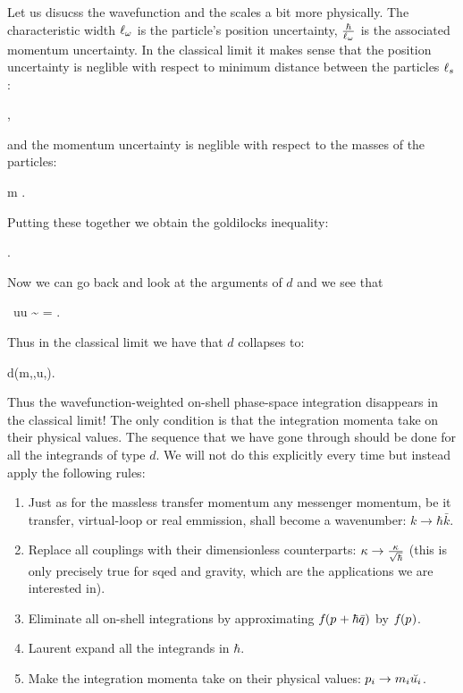\documentclass[
  10pt,
  a4paper,
  DIV=11,
  numbers=noendperiod,
  twoside]{scrreprt}
\providecommand{\tightlist}{%
  \setlength{\itemsep}{0pt}\setlength{\parskip}{0pt}}\usepackage{longtable,booktabs,array}
\let\[\relax \let\]\relax %
\DeclareRobustCommand{\[}{\begin{equation}}
\DeclareRobustCommand{\]}{\end{equation}}
\begin{document}
Let us disucss the wavefunction and the scales a bit more physically.
The characteristic width \(\wfwidth\) is the particle's position
uncertainty, \(\frac{\hbar}{\wfwidth}\) is the associated momentum
uncertainty. In the classical limit it makes sense that the position
uncertainty is neglible with respect to minimum distance between the
particles \(\scatlen\):

\[
\wfwidth\ll \scatlen,
\]

and the momentum uncertainty is neglible with respect to the masses of
the particles:

\[
\frac{\hbar}{\wfwidth}\ll m \implies \comptlen\ll \wfwidth.
\]

Putting these together we obtain the goldilocks inequality:

\[
\comptlen\ll\wfwidth\ll\scatlen.
\]

Now we can go back and look at the arguments of \(d\) and we see that

\[
\scatlen\, \tw \cdot u\gg\wfwidth \tw \cdot u \sim \sqrt{\xi} =   \frac{\comptlen}{\wfwidth}\gg\frac{\comptlen}{\scatlen}.
\]

Thus in the classical limit we have that \(d\) collapses to:

\[
d(m,\xi,u,\tm)\propto{}.
\]

Thus the wavefunction-weighted on-shell phase-space integration
disappears in the classical limit! The only condition is that the
integration momenta take on their physical values. The sequence that we
have gone through should be done for all the integrands of type \(d\).
We will not do this explicitly every time but instead apply the
following rules:

\begin{enumerate}
\def\labelenumi{\arabic{enumi}.}
\tightlist
\item
  Just as for the massless transfer momentum any messenger momentum, be
  it transfer, virtual-loop or real emmission, shall become a
  wavenumber: \(k\to \hbar \bar{k}\).
\item
  Replace all couplings with their dimensionless counterparts:
  \(\coupling\to \frac{\coupling}{\sqrt{\hbar} }\) (this is only
  precisely true for \gls{sqed} and gravity, which are the applications
  we are interested in).
\item
  Eliminate all on-shell integrations by approximating
  \(\wf(\emom+\hbar\tw)\) by \(\wf(\emom)\).
\item
  Laurent expand all the integrands in \(\hbar\).
\item
  Make the integration momenta take on their physical values:
  \(\emom[i]\to \mass[i]\cls{\vel[i]}\).
\end{enumerate}
\end{document}
